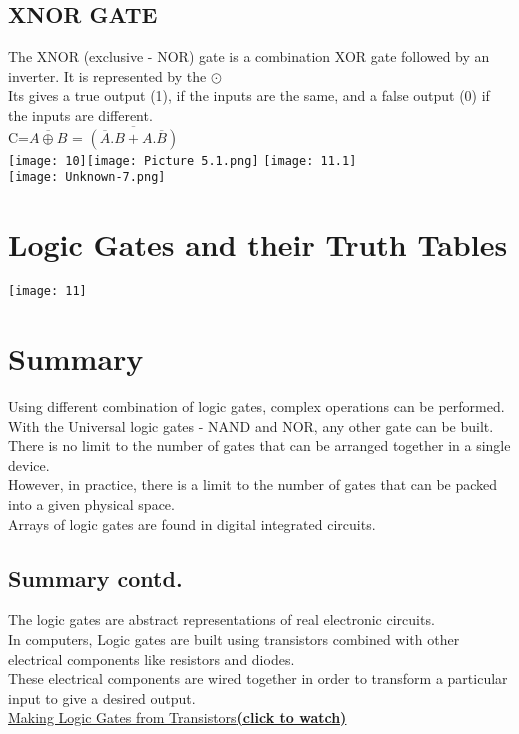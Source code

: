 \documentclass{article}
\begin{document}
\subsection{XNOR GATE}
The XNOR (exclusive - NOR) gate is a combination XOR gate followed by an inverter. It is represented by the $\odot$\\
Its gives a  true output (1), if the inputs are the same, and a false output (0) if the inputs are different.\\
C=$\overline{A \oplus B}$ = $\overline{(\overline{A}.B + A.\overline{B})}$\\
\texttt{[image: 10]}\texttt{[image: Picture 5.1.png]} \texttt{[image: 11.1]}\\
\texttt{[image: Unknown-7.png]}\\
\newpage
\section{Logic Gates and their Truth Tables}
\texttt{[image: 11]}
\newpage
\section{Summary}
Using different combination of logic gates, complex operations can be performed.\cite{grace2020} \\
With the Universal logic gates - NAND and NOR, any other gate can be built.\\
There is no limit to the number of gates that can be arranged together in a single device.\\
However, in practice, there is a limit to the number of gates that can be packed into a given physical space. 
\\
Arrays of logic gates are found in digital integrated circuits.
\\
\newpage
\subsection{Summary contd.}
The logic gates are abstract representations of real electronic circuits.\cite{grace2021study}\\
In computers, Logic gates are built using transistors combined with other electrical components like resistors and diodes. \\
These electrical components are wired together in order to transform a particular input to give a desired output.\\
\href{https://www.youtube.com/watch?v=sTu3LwpF6XI&t=481s}{Making Logic Gates from Transistors\textbf{(click to watch)}}
\newpage
\end{document}
